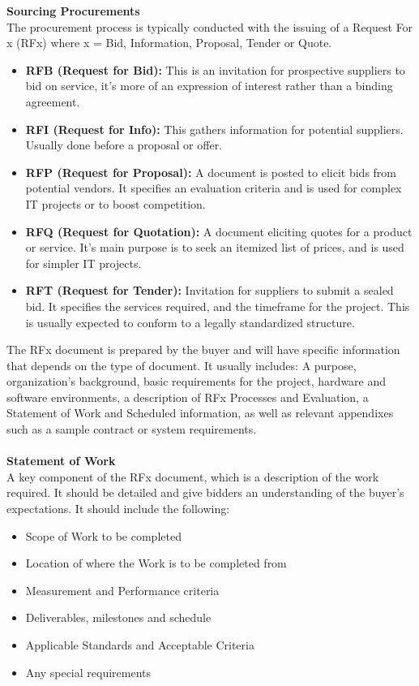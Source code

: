 \documentclass[a4paper,10pt]{article}
\begin{document}
\textcolor{BlueGreen}{\textbf{Sourcing Procurements}} \\
The procurement process is typically conducted with the issuing of a Request For x (RFx) where x = Bid, Information, Proposal, Tender or Quote. 
\begin{itemize}
	\item \textbf{RFB (Request for Bid):} This is an invitation for prospective suppliers to bid on service, it's more of an expression of interest rather than a binding agreement. 
	\item \textbf{RFI (Request for Info):} This gathers information for potential suppliers. Usually done before a proposal or offer. 
	\item \textbf{RFP (Request for Proposal):} A document is posted to elicit bids from potential vendors. It specifies an evaluation criteria and is used for complex IT projects or to boost competition. 
	\item \textbf{RFQ (Request for Quotation):} A document eliciting quotes for a product or service. It's main purpose is to seek an itemized list of prices, and is used for simpler IT projects. 
	\item \textbf{RFT (Request for Tender):} Invitation for suppliers to submit a sealed bid. It specifies the services required, and the timeframe for the project. This is usually expected to conform to a legally standardized structure.
\end{itemize}
The RFx document is prepared by the buyer and will have specific information that depends on the type of document. It usually includes: A purpose, organization's background, basic requirements for the project, hardware and software environments, a description of RFx Processes and Evaluation, a Statement of Work and Scheduled information, as well as relevant appendixes such as a sample contract or system requirements. \\\\
\textcolor{BlueGreen}{\textbf{Statement of Work}} \\ 
A key component of the RFx document, which is a description of the work required. It should be detailed and give bidders an understanding of the buyer's expectations. It should include the following: 
\begin{itemize}
	\item Scope of Work to be completed 
	\item Location of where the Work is to be completed from 
	\item Measurement and Performance criteria
	\item Deliverables, milestones and schedule 
	\item Applicable Standards and Acceptable Criteria 
	\item Any special requirements 
\end{itemize}
\end{document}
